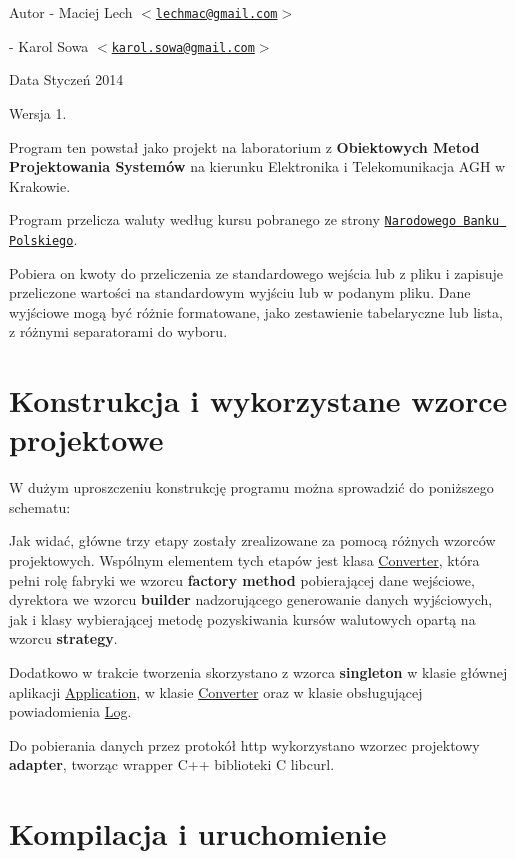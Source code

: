 \begin{DoxyAuthor}{\-Autor}
-\/ \-Maciej \-Lech $<$\href{mailto:lechmac@gmail.com}{\tt lechmac@gmail.\-com}$>$\par
-\/ \-Karol \-Sowa $<$\href{mailto:karol.sowa@gmail.com}{\tt karol.\-sowa@gmail.\-com}$>$ 
\end{DoxyAuthor}
\begin{DoxyDate}{\-Data}
\-Styczeń 2014 
\end{DoxyDate}
\begin{DoxyVersion}{\-Wersja}
1.
\end{DoxyVersion}
\-Program ten powstał jako projekt na laboratorium z {\bfseries \-Obiektowych \-Metod \-Projektowania \-Systemów} na kierunku \-Elektronika i \-Telekomunikacja \-A\-G\-H w \-Krakowie.\par
\par
 \-Program przelicza waluty według kursu pobranego ze strony \href{http://www.nbp.pl}{\tt \-Narodowego \-Banku \-Polskiego}.\par
 \-Pobiera on kwoty do przeliczenia ze standardowego wejścia lub z pliku i zapisuje przeliczone wartości na standardowym wyjściu lub w podanym pliku. \-Dane wyjściowe mogą być różnie formatowane, jako zestawienie tabelaryczne lub lista, z różnymi separatorami do wyboru.\hypertarget{index_etykieta-konstrukcja}{}\section{\-Konstrukcja i wykorzystane wzorce projektowe}\label{index_etykieta-konstrukcja}
\-W dużym uproszczeniu konstrukcję programu można sprowadzić do poniższego schematu\-: 
\begin{DoxyItemize}
\item \-Jak widać, główne trzy etapy zostały zrealizowane za pomocą różnych wzorców projektowych. \-Wspólnym elementem tych etapów jest klasa \hyperlink{class_converter}{\-Converter}, która pełni rolę fabryki we wzorcu {\bfseries factory method} pobierającej dane wejściowe, dyrektora we wzorcu {\bfseries builder} nadzorującego generowanie danych wyjściowych, jak i klasy wybierającej metodę pozyskiwania kursów walutowych opartą na wzorcu {\bfseries strategy}.\par

\item \-Dodatkowo w trakcie tworzenia skorzystano z wzorca {\bfseries singleton} w klasie głównej aplikacji \hyperlink{class_application}{\-Application}, w klasie \hyperlink{class_converter}{\-Converter} oraz w klasie obsługującej powiadomienia \hyperlink{class_log}{\-Log}.\par

\item \-Do pobierania danych przez protokół http wykorzystano wzorzec projektowy {\bfseries adapter}, tworząc wrapper \-C++ biblioteki \-C libcurl.
\end{DoxyItemize}\hypertarget{index_etykieta-korzystanie}{}\section{\-Kompilacja i uruchomienie}\label{index_etykieta-korzystanie}

